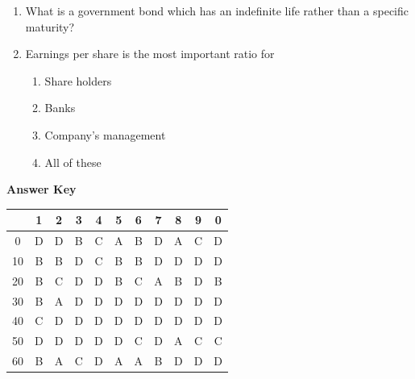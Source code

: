 \documentclass[11pt,a4paper]{article}
\begin{document}
\begin{enumerate}
\item{What is a government bond which has an indefinite life rather than a specific maturity?}
\\
\item{Earnings per share is the most important ratio for}
\begin{enumerate}[label=\Alph*.]
\item{Share holders}
\item{Banks}
\item{Company's management}
\item{All of these}
\end{enumerate}
\end{enumerate}
\textbf{Answer Key}
\begin{tabular}{ | c | c c c c c c c c c c | }
\hline
 & 1 & 2 & 3 & 4 & 5 & 6 & 7 & 8 & 9 & 0 \\
\hline
0 & D & D & B & C & A & B & D & A & C & D \\
10 & B & B & D & C & B & B & D & D & D & D \\
20 & B & C & D & D & B & C & A & B & D & B \\
30 & B & A & D & D & D & D & D & D & D & D \\
40 & C & D & D & D & D & D & D & D & D & D \\
50 & D & D & D & D & D & C & D & A & C & C \\
60 & B & A & C & D & A & A & B & D & D & D \\
\hline
\end{tabular}
\clearpage
\end{document}
